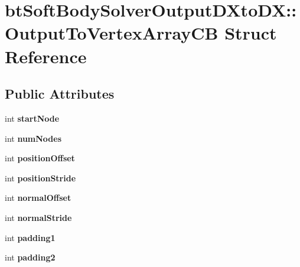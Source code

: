 \hypertarget{structbtSoftBodySolverOutputDXtoDX_1_1OutputToVertexArrayCB}{}\section{bt\+Soft\+Body\+Solver\+Output\+D\+Xto\+DX\+:\+:Output\+To\+Vertex\+Array\+CB Struct Reference}
\label{structbtSoftBodySolverOutputDXtoDX_1_1OutputToVertexArrayCB}
\subsection*{Public Attributes}
\begin{DoxyCompactItemize}
\item 
\mbox{\label{structbtSoftBodySolverOutputDXtoDX_1_1OutputToVertexArrayCB_a5a1c3cb1be2443577f36e3a57ad6e379}} 
int {\bfseries start\+Node}
\item 
\mbox{\label{structbtSoftBodySolverOutputDXtoDX_1_1OutputToVertexArrayCB_a366d01a08408bce009dd2281134ff7cc}} 
int {\bfseries num\+Nodes}
\item 
\mbox{\label{structbtSoftBodySolverOutputDXtoDX_1_1OutputToVertexArrayCB_a115a80a704d1f2cb1b7b6f52ce11f7a5}} 
int {\bfseries position\+Offset}
\item 
\mbox{\label{structbtSoftBodySolverOutputDXtoDX_1_1OutputToVertexArrayCB_af11d0d486676fdc860f0f2ad928236a7}} 
int {\bfseries position\+Stride}
\item 
\mbox{\label{structbtSoftBodySolverOutputDXtoDX_1_1OutputToVertexArrayCB_a8b80f3df0c31ece84045b90fb726456b}} 
int {\bfseries normal\+Offset}
\item 
\mbox{\label{structbtSoftBodySolverOutputDXtoDX_1_1OutputToVertexArrayCB_a6607794b25eb77aee9a62b213d517535}} 
int {\bfseries normal\+Stride}
\item 
\mbox{\label{structbtSoftBodySolverOutputDXtoDX_1_1OutputToVertexArrayCB_adc031d6f081c2b0099b0b306973f5030}} 
int {\bfseries padding1}
\item 
\mbox{\label{structbtSoftBodySolverOutputDXtoDX_1_1OutputToVertexArrayCB_a36101f3091974966cce1996b5bbe6969}} 
int {\bfseries padding2}
\end{DoxyCompactItemize}


